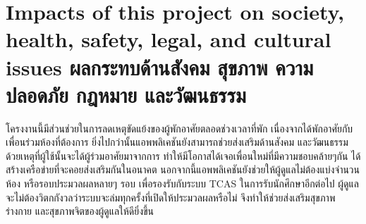 

\section{\ifenglish%
      Impacts of this project on society, health, safety, legal, and cultural issues
  \else%
      ผลกระทบด้านสังคม สุขภาพ ความปลอดภัย กฎหมาย และวัฒนธรรม
  \fi}

โครงงานนี้มีส่วนช่วยในการลดเหตุขัดแย้งของผู้พักอาศัยตลอดช่วงเวลาที่พัก
เนื่องจากได้พักอาศัยกับเพื่อนร่วมห้องที่ต้องการ ยิ่งไปกว่านั้นแอพพลิเคชันยังสามารถช่วยส่งเสริมด้านสังคม 
และวัฒนธรรม ด้วยเหตุที่ผู้ใช้นั้นจะได้ผู้ร่วมอาศัยมาจากการ ทำให้มีโอกาสได้เจอเพื่อนใหม่ที่มีความชอบคล้ายๆกัน 
ได้สร้างเครือข่ายที่จะคอยส่งเสริมกันในอนาคต นอกจากนี้แอพพลิเคชันยังช่วยให้ผู้ดูแลไม่ต้องแบ่งจำนวนห้อง 
หรือรอบประมวลผลหลายๆ รอบ เพื่อรองรับกับระบบ TCAS ในการรับนักศึกษาอีกต่อไป
ผู้ดูแลจะไม่ต้องวิตกกังวลว่าระบบจะล่มทุกครั้งที่เปิดให้ประมวลผลหรือไม่ จึงทำให้ช่วยส่งเสริมสุขภาพร่างกาย 
และสุขภาพจิตของผู้ดูแลให้ดียิ่งขึ้น



